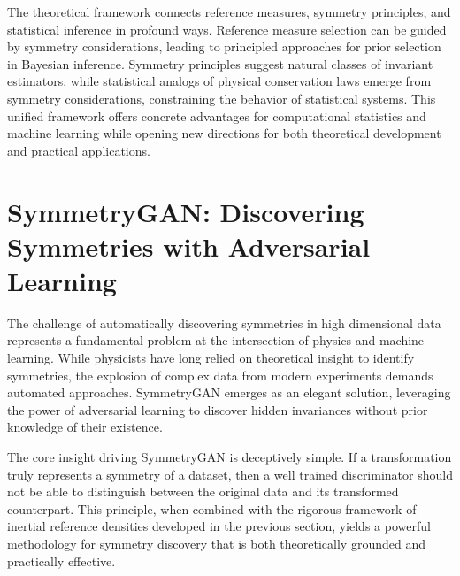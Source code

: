         The theoretical framework connects reference measures, symmetry principles, and statistical inference in profound ways.
        Reference measure selection can be guided by symmetry considerations, leading to principled approaches for prior selection in Bayesian inference. 
        Symmetry principles suggest natural classes of invariant estimators, while statistical analogs of physical conservation laws emerge from symmetry considerations, constraining the behavior of statistical systems.
        This unified framework offers concrete advantages for computational statistics and machine learning while opening new directions for both theoretical development and practical applications.

\section{SymmetryGAN: Discovering Symmetries with Adversarial Learning}
\label{sec:symmetry-gan-main}
The challenge of automatically discovering symmetries in high dimensional data represents a fundamental problem at the intersection of physics and machine learning.
%
While physicists have long relied on theoretical insight to identify symmetries, the explosion of complex data from modern experiments demands automated approaches.
%
SymmetryGAN emerges as an elegant solution, leveraging the power of adversarial learning to discover hidden invariances without prior knowledge of their existence.

The core insight driving SymmetryGAN is deceptively simple.
%
If a transformation truly represents a symmetry of a dataset, then a well trained discriminator should not be able to distinguish between the original data and its transformed counterpart.
%
This principle, when combined with the rigorous framework of inertial reference densities developed in the previous section, yields a powerful methodology for symmetry discovery that is both theoretically grounded and practically effective.

